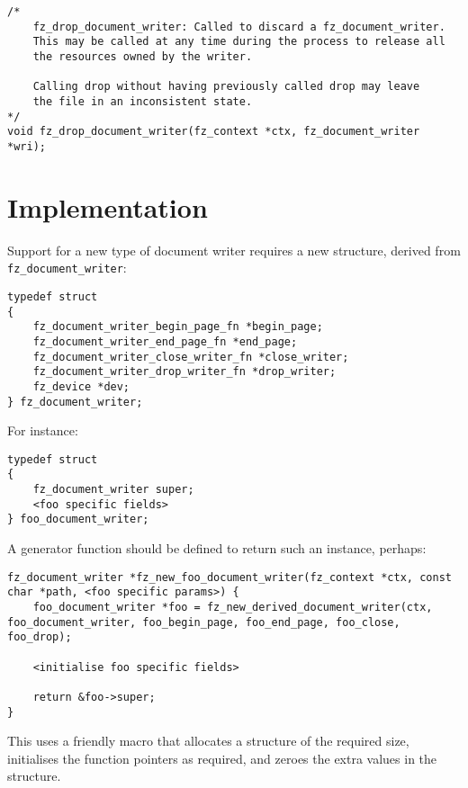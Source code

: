 \documentclass[oneside]{book}
\begin{document}
\begin{lstlisting}
/*
	fz_drop_document_writer: Called to discard a fz_document_writer.
	This may be called at any time during the process to release all
	the resources owned by the writer.

	Calling drop without having previously called drop may leave
	the file in an inconsistent state.
*/
void fz_drop_document_writer(fz_context *ctx, fz_document_writer *wri);
\end{lstlisting}

\section{Implementation}

Support for a new type of document writer requires a new structure, derived from \texttt{fz\_document\_writer}:

\begin{lstlisting}
typedef struct
{
	fz_document_writer_begin_page_fn *begin_page;
	fz_document_writer_end_page_fn *end_page;
	fz_document_writer_close_writer_fn *close_writer;
	fz_document_writer_drop_writer_fn *drop_writer;
	fz_device *dev;
} fz_document_writer;
\end{lstlisting}

For instance:

\begin{lstlisting}
typedef struct
{
	fz_document_writer super;
	<foo specific fields>
} foo_document_writer;
\end{lstlisting}

A generator function should be defined to return such an instance, perhaps:

\begin{lstlisting}
fz_document_writer *fz_new_foo_document_writer(fz_context *ctx, const char *path, <foo specific params>) {
    foo_document_writer *foo = fz_new_derived_document_writer(ctx, foo_document_writer, foo_begin_page, foo_end_page, foo_close, foo_drop);
    
    <initialise foo specific fields>
    
    return &foo->super;
}
\end{lstlisting}

This uses a friendly macro that allocates a structure of the required size, initialises the function pointers as required, and zeroes the extra values in the structure.
\end{document}
